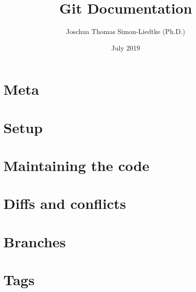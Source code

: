 \documentclass{report}
\title{Git Documentation}
\author{Joschua Thomas Simon-Liedtke (Ph.D.)}
\date{July 2019}
\begin{document}
\maketitle

\chapter*{Meta}



\chapter{Setup}



\chapter{Maintaining the code}



\chapter{Diffs and conflicts}



\chapter{Branches}



\chapter{Tags}


\end{document}
